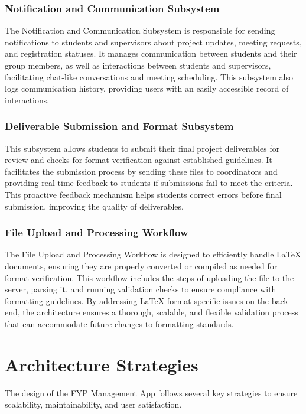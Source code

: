 \documentclass{FastFyp}
\begin{document}
\subsubsection{Notification and Communication Subsystem}
The Notification and Communication Subsystem is responsible for sending notifications to students and supervisors about project updates, meeting requests, and registration statuses.
It manages communication between students and their group members, as well as interactions between students and supervisors, facilitating chat-like conversations and meeting scheduling.
This subsystem also logs communication history, providing users with an easily accessible record of interactions.

\subsubsection{Deliverable Submission and Format Subsystem}
This subsystem allows students to submit their final project deliverables for review and checks for format verification against established guidelines.
It facilitates the submission process by sending these files to coordinators and providing real-time feedback to students if submissions fail to meet the criteria.
This proactive feedback mechanism helps students correct errors before final submission, improving the quality of deliverables.

\subsubsection{File Upload and Processing Workflow}
The File Upload and Processing Workflow is designed to efficiently handle LaTeX documents, ensuring they are properly converted or compiled as needed for format verification.
This workflow includes the steps of uploading the file to the server, parsing it, and running validation checks to ensure compliance with formatting guidelines.
By addressing LaTeX format-specific issues on the back-end, the architecture ensures a thorough, scalable, and flexible validation process that can accommodate future changes to formatting standards.



\section{Architecture Strategies}
The design of the FYP Management App follows several key strategies to ensure scalability, maintainability, and user satisfaction.
\end{document}
